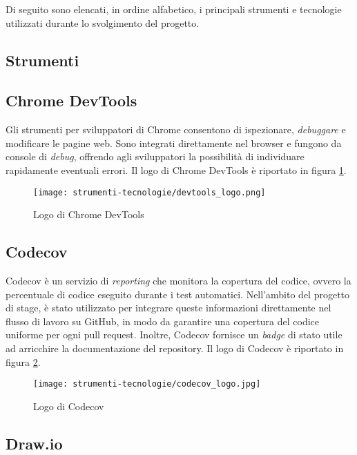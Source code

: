 Di seguito sono elencati, in ordine alfabetico, i principali strumenti e tecnologie utilizzati durante lo svolgimento del progetto.

\subsection{Strumenti}

\subsection*{Chrome DevTools}

Gli strumenti per sviluppatori di Chrome consentono di ispezionare, \textit{debuggare} e modificare le pagine web. Sono integrati direttamente nel browser e fungono da console di \textit{debug}, offrendo agli sviluppatori la possibilità di individuare rapidamente eventuali errori. Il logo di Chrome DevTools è riportato in figura \ref{fig:logo_chrome_devtools}.

\begin{figure}[H]
  \centering 
  \texttt{[image: strumenti-tecnologie/devtools\_logo.png]} 
  \caption{Logo di Chrome DevTools}
  \label{fig:logo_chrome_devtools}
\end{figure}

\subsection*{Codecov}

Codecov è un servizio di \textit{reporting} che monitora la copertura del codice, ovvero la percentuale di codice eseguito durante i test automatici. Nell’ambito del progetto di stage, è stato utilizzato per integrare queste informazioni direttamente nel flusso di lavoro su GitHub, in modo da garantire una copertura del codice uniforme per ogni \gls{pull request}. Inoltre, Codecov fornisce un \textit{badge} di stato utile ad arricchire la documentazione del \gls{repository}. Il logo di Codecov è riportato in figura \ref{fig:logo_codecov}.

\begin{figure}[H]
  \centering 
  \texttt{[image: strumenti-tecnologie/codecov\_logo.jpg]} 
  \caption{Logo di Codecov}
  \label{fig:logo_codecov}
\end{figure}

\subsection*{Draw.io}

